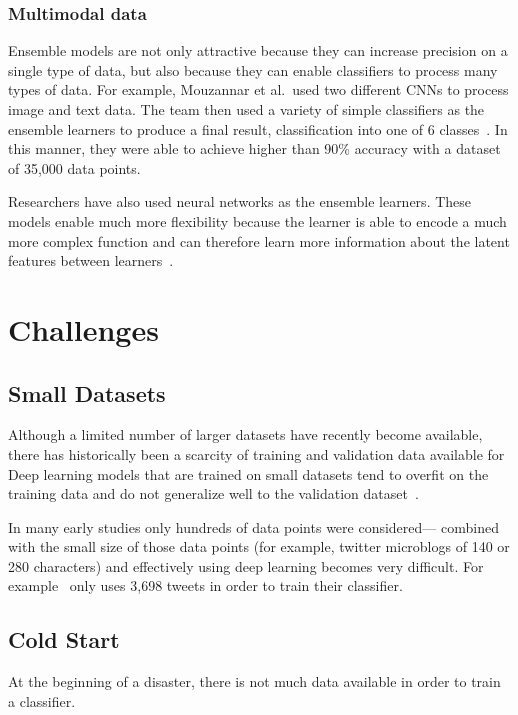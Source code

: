   
  \subsubsection{Multimodal data} 
  Ensemble models are not only attractive because they can increase precision on a
  single type of data, but also because they can enable classifiers to process
  many types of data. For example, Mouzannar et al.\ used two different CNNs to 
  process image and text data. The team then used a variety of simple classifiers 
  as the ensemble learners to produce a final result,
  classification into one of 6 classes~\cite{mouzannarDamageIdentificationSocial2018}.
  In this manner, they were able to achieve higher than 90\% accuracy with a dataset of 
  35,000 data points.

  Researchers have also used neural networks as the ensemble learners. These models enable
  much more flexibility because the learner is able to encode a much more complex
  function and can therefore learn more information about the
  latent features between learners~\cite{jordanHierarchicalMixturesExperts1994}.

\section{Challenges}

\subsection{Small Datasets}
Although a limited number of larger datasets have recently become available, there has
historically been a scarcity of training and validation data available for
Deep learning models that are trained on small datasets tend to overfit on the
training data and do not generalize well to the validation
dataset~\cite{perezEffectivenessDataAugmentation2017,nguyenRapidClassificationCrisisRelated}.

In many early studies only hundreds of data points were considered--- combined
with the small size of those data points (for example, twitter microblogs of
140 or 280 characters) and effectively using deep learning becomes very
difficult. For example~\cite{nagyCrowdSentimentDetection2012} only uses 3,698 tweets in
order to train their classifier.
\subsection{Cold Start}

At the beginning of a disaster, there is not much data available in order to
train a classifier.

